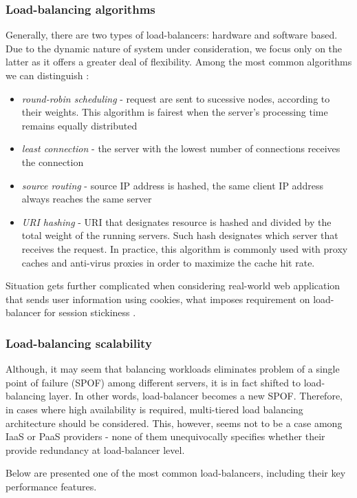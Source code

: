 \subsubsection{Load-balancing algorithms}
Generally, there are two types of load-balancers: hardware and software based. Due to the dynamic nature of system under consideration, we focus only on the latter as it offers a greater deal of flexibility. Among the most common algorithms we can distinguish \cite{HaProxyDoc}:
\begin{itemize}
 \item \textit{round-robin scheduling} - request are sent to sucessive nodes, according to their weights. This algorithm is fairest when the server's processing time remains equally distributed \cite{HaProxyDoc}
 \item \textit{least connection} - the server with the lowest number of connections receives the connection
 \item \textit{source routing} - source IP address is hashed, the same client IP address always reaches the same server
 \item \textit{URI hashing} - URI that designates resource is hashed and divided by the total weight of the running servers. Such hash designates which server that receives the request. In practice, this algorithm is commonly used with proxy caches and anti-virus proxies in order to maximize the cache hit rate.
\end{itemize}

Situation gets further complicated when considering real-world web application that sends user information using cookies, what imposes requirement on load-balancer for session stickiness \cite{StBaMa11}. 

\subsubsection{Load-balancing scalability}
Although, it may seem that balancing workloads eliminates problem of a single point of failure (SPOF) among different servers, it is in fact shifted to load-balancing layer. In other words, load-balancer becomes a new SPOF. Therefore, in cases where high availability is required, multi-tiered load balancing architecture should be considered. This, however, seems not to be a case among IaaS or PaaS providers - none of them unequivocally specifies whether their provide redundancy at load-balancer level.

Below are presented one of the most common load-balancers, including their key performance features.

